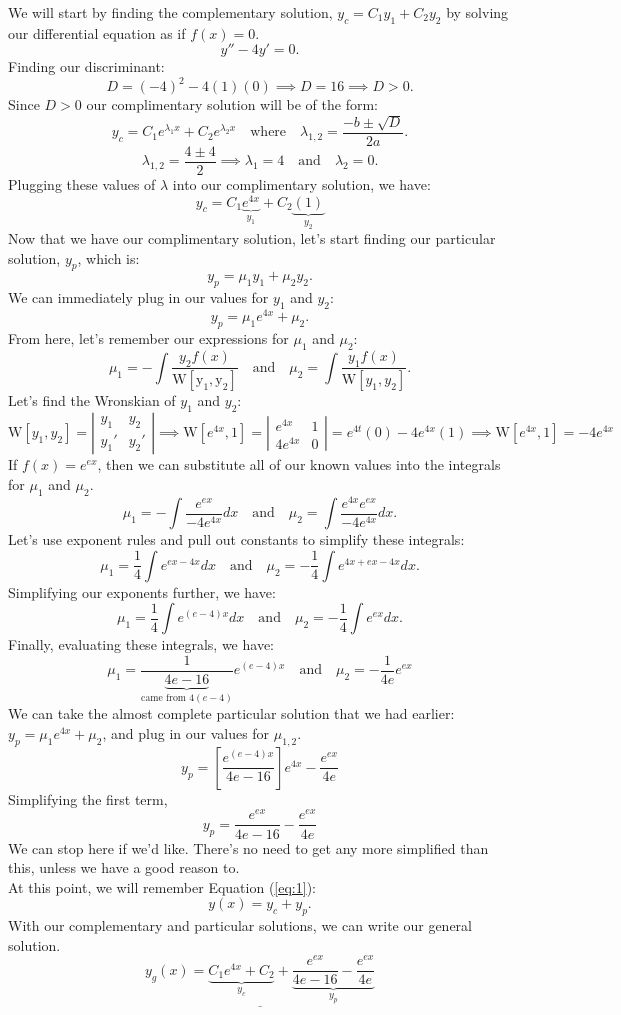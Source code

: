 \documentclass[a4paper,12pt]{article} %
\begin{document}
We will start by finding the complementary solution, $y_c=C_1 y_1+C_2 y_2$ by solving our differential equation as if $f(x)=0$.
$$ y''-4y' = 0. $$
Finding our discriminant:
$$ D = (-4)^2 - 4(1)(0) \implies D = 16 \implies D>0. $$
Since $D>0$ our complimentary solution will be of the form:
$$ y_c = C_1e^{\lambda_1x} + C_2e^{\lambda_2x} \quad\text{where}\quad \lambda_{1,2} = \frac{-b \pm \sqrt{D}}{2a}. $$
$$ \lambda_{1,2} = \frac{4 \pm 4}{2} \implies \lambda_1 = 4 \quad\text{and}\quad \lambda_2 = 0. $$
Plugging these values of $\lambda$ into our complimentary solution, we have:
$$ \boxed{y_c = C_1\underbrace{e^{4x}}_{y_1} + C_2\underbrace{(1)}_{y_2}} $$
Now that we have our complimentary solution, let's start finding our particular solution, $y_p$, which is:
$$ y_p = \mu_1y_1 + \mu_2y_2. $$
We can immediately plug in our values for $y_1$ and $y_2$:
$$ y_p = \mu_1e^{4x} + \mu_2. $$
From here, let's remember our expressions for $\mu_1$ and $\mu_2$:
$$ \mu_1 = -\int \frac{y_2f(x)}{\mathrm{W[y_1,y_2]}} \quad \text{and} \quad \mu_2 = \int \frac{y_1f(x)}{\mathrm{W}[y_1,y_2]} .$$
Let's find the Wronskian of $y_1$ and $y_2$:
$$ \mathrm{W}[y_1,y_2] = \left|\begin{matrix}
	y_1 & y_2 \\
	y_1' & y_2'
\end{matrix}\right| \implies \mathrm{W}\left[e^{4x}, 1\right] = \left|\begin{matrix}
	e^{4x} & 1 \\
	4e^{4x} & 0
\end{matrix}\right| = e^{4t}(0) - 4e^{4x}(1) \implies \boxed{\mathrm{W}\left[e^{4x}, 1\right] = -4e^{4x}}$$
If $f(x) = e^{ex}$, then we can substitute all of our known values into the integrals for $\mu_1$ and $\mu_2$.
$$ \mu_1 = -\int \frac{e^{ex}}{-4e^{4x}}dx \quad\text{and}\quad \mu_2 = \int \frac{e^{4x}e^{ex}}{-4e^{4x}}dx.$$
Let's use exponent rules and pull out constants to simplify these integrals:
$$ \mu_1 = \frac{1}{4} \int e^{ex - 4x}dx \quad\text{and}\quad \mu_2 = -\frac{1}{4}\int e^{4x + ex - 4x} dx. $$
Simplifying our exponents further, we have:
$$ \mu_1 = \frac{1}{4}\int e^{(e-4)x}dx \quad\text{and}\quad \mu_2 = -\frac{1}{4}\int e^{ex}dx.  $$
Finally, evaluating these integrals, we have:
$$ \mu_1 = \frac{1}{\underbrace{4e-16}_{\text{came from }4(e-4)}}e^{(e-4)x} \quad\text{and}\quad \mu_2 = -\frac{1}{4e} e^{ex}  $$
We can take the almost complete particular solution that we had earlier: $y_p = \mu_1 e^{4x} + \mu_2$, and plug in our values for $\mu_{1,2}$.
$$ y_p = \left[\frac{e^{(e-4)x}}{4e-16}\right]e^{4x} - \frac{e^{ex}}{4e} $$
Simplifying the first term,
$$ \boxed{y_p = \frac{e^{ex}}{4e-16} - \frac{e^{ex}}{4e}} $$
We can stop here if we'd like. There's no need to get any more simplified than this, unless we have a good reason to.\\

At this point, we will remember Equation (\ref{eq:1}):
$$ y(x) = y_c + y_p. $$
With our complementary and particular solutions, we can write our general solution.
$$ \underline{\boxed{y_g(x) = \underbrace{C_1e^{4x} + C_2}_{y_c} + \underbrace{\frac{e^{ex}}{4e-16} - \frac{e^{ex}}{4e}}_{y_p}}} $$
\end{document}
